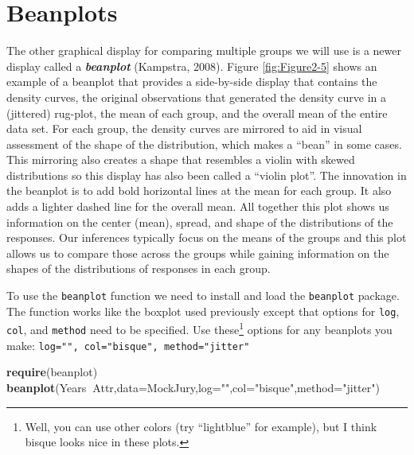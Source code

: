 \documentclass[]{book}
\newenvironment{Shaded}{\begin{snugshade}}{\end{snugshade}}
\newcommand{\KeywordTok}[1]{\textcolor[rgb]{0.13,0.29,0.53}{\textbf{#1}}}
\newcommand{\DataTypeTok}[1]{\textcolor[rgb]{0.13,0.29,0.53}{#1}}
\newcommand{\StringTok}[1]{\textcolor[rgb]{0.31,0.60,0.02}{#1}}
\newcommand{\OperatorTok}[1]{\textcolor[rgb]{0.81,0.36,0.00}{\textbf{#1}}}
\newcommand{\NormalTok}[1]{#1}
\let\rmarkdownfootnote\footnote%
\def\footnote{\protect\rmarkdownfootnote}
\begin{document}
\section{Beanplots}\label{section2-2}

The other graphical display for comparing multiple groups we will use is
a newer display called a \textbf{\emph{beanplot}} (Kampstra, 2008).
Figure \ref{fig:Figure2-5} shows an example of a beanplot that provides
a side-by-side display that contains the density curves, the original
observations that generated the density curve in a (jittered) rug-plot,
the mean of each group, and the overall mean of the entire data set. For
each group, the density curves are mirrored to aid in visual assessment
of the shape of the distribution, which makes a ``bean'' in some cases.
This mirroring also creates a shape that resembles a violin with skewed
distributions so this display has also been called a ``violin plot''.
The innovation in the beanplot is to add bold horizontal lines at the
mean for each group. It also adds a lighter dashed line for the overall
mean. All together this plot shows us information on the center (mean),
spread, and shape of the distributions of the responses. Our inferences
typically focus on the means of the groups and this plot allows us to
compare those across the groups while gaining information on the shapes
of the distributions of responses in each group.

To use the \texttt{beanplot} function we need to install and load the
\texttt{beanplot} package. The function works like the boxplot used
previously except that options for \texttt{log}, \texttt{col}, and
\texttt{method} need to be specified. Use these\footnote{Well, you can
  use other colors (try ``lightblue'' for example), but I think bisque
  looks nice in these plots.} options for any beanplots you make:
\texttt{log="",\ col="bisque",\ method="jitter"}




\begin{Shaded}
\begin{Highlighting}[]
\KeywordTok{require}\NormalTok{(beanplot)}
\KeywordTok{beanplot}\NormalTok{(Years}\OperatorTok{~}\NormalTok{Attr,}\DataTypeTok{data=}\NormalTok{MockJury,}\DataTypeTok{log=}\StringTok{""}\NormalTok{,}\DataTypeTok{col=}\StringTok{"bisque"}\NormalTok{,}\DataTypeTok{method=}\StringTok{"jitter"}\NormalTok{)}
\end{Highlighting}
\end{Shaded}
\end{document}
